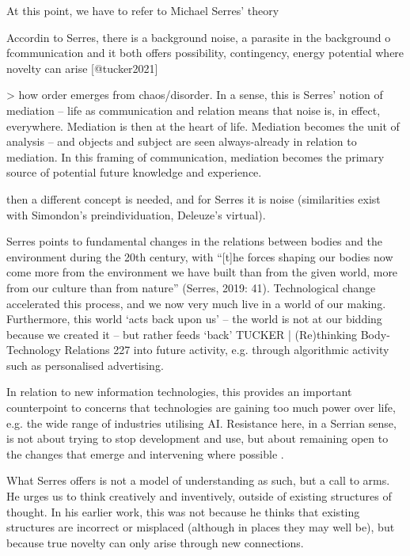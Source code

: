 \begin{orangebox}
	At this point, we have to refer to Michael Serres' theory


	Accordin to Serres, there is a background noise, a parasite in the background o fcommunication and it both offers possibility, contingency, energy potential where novelty can arise [@tucker2021]

	> how order emerges from chaos/disorder. In a sense,  this is Serres’ notion of mediation – life as communication and relation means that  noise is, in effect, everywhere. Mediation is then at the heart of life. Mediation becomes  the unit of analysis – and objects and subject are seen always-already in relation to  mediation. In this framing of communication, mediation becomes the primary source  of potential future knowledge and experience.


	then a different concept is needed, and for  Serres it is noise (similarities exist with Simondon’s preindividuation, Deleuze’s virtual).

	Serres  points to fundamental changes in the relations between bodies and the environment  during the 20th century, with “[t]he forces shaping our bodies now come more from  the environment we have built than from the given world, more from our culture than  from nature” (Serres, 2019: 41). Technological change accelerated this process, and we  now very much live in a world of our making. Furthermore, this world ‘acts back upon  us’ – the world is not at our bidding because we created it – but rather feeds ‘back’ TUCKER | (Re)thinking Body-Technology Relations  227  into future activity, e.g. through algorithmic activity such as personalised advertising.


	In relation to new information technologies, this  provides an important counterpoint to concerns that technologies are gaining too  much power over life, e.g. the wide range of industries utilising AI. Resistance here, in a Serrian sense, is not about trying to stop development and use, but about remaining  open to the changes that emerge and intervening where possible \parencite[227-228]{tucker2021a} .


	What Serres offers is not a model of understanding as such, but a call to arms. He  urges us to think creatively and inventively, outside of existing structures of thought.  In his earlier work, this was not because he thinks that existing structures are incorrect  or misplaced (although in places they may well be), but because true novelty can only  arise through new connections.
\end{orangebox}



